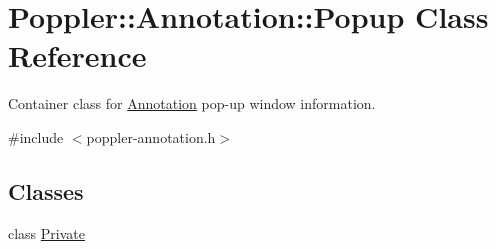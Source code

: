 \hypertarget{class_poppler_1_1_annotation_1_1_popup}{}\section{Poppler\+:\+:Annotation\+:\+:Popup Class Reference}
\label{class_poppler_1_1_annotation_1_1_popup}


Container class for \hyperlink{class_poppler_1_1_annotation}{Annotation} pop-\/up window information.  




{\ttfamily \#include $<$poppler-\/annotation.\+h$>$}

\subsection*{Classes}
\begin{DoxyCompactItemize}
\item 
class \hyperlink{class_poppler_1_1_annotation_1_1_popup_1_1_private}{Private}
\end{DoxyCompactItemize}
